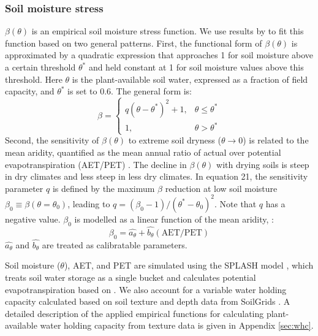 \documentclass[gmd, manuscript]{copernicus}
\begin{document}
\subsubsection{Soil moisture stress}
\label{sec:soilmstress}
$\beta(\theta)$ is an empirical soil moisture stress function. We use results by \citet{stocker18newphyt} to fit this function based on two general patterns. First, the functional form of $\beta(\theta)$ is approximated by a quadratic expression that approaches 1 for soil moisture above a certain threshold $\theta^{\ast}$ and held constant at 1 for soil moisture values above this threshold. Here $\theta$ is the plant-available soil water, expressed as a fraction of field capacity, and $\theta^{\ast}$ is set to 0.6. The general form is:
\begin{equation}
\label{eq:soilmstress}
    \beta =
\begin{cases}
    q(\theta - \theta^{\ast})^2 + 1,& \theta \leq \theta^{\ast}\\
    1,              & \theta > \theta^{\ast}
\end{cases}
\end{equation}
Second, the sensitivity of $\beta(\theta)$ to extreme soil dryness ($\theta \rightarrow 0$) is related to the mean aridity, quantified as the mean annual ratio of actual over potential evapotranspiration (AET/PET) \citep{stocker18newphyt}. The decline in $\beta(\theta)$ with drying soils is steep in dry climates and less steep in less dry climates. In equation 21, the sensitivity parameter $q$ is defined by the maximum $\beta$ reduction at low soil moisture $\beta_0\equiv\beta(\theta=\theta_0)$, leading to $q=(\beta_0-1)/(\theta^{\ast}-\theta_0)^2$. Note that $q$ has a negative value. $\beta_0$ is modelled as a linear function of the mean aridity, :
\begin{equation}
\label{eq:soilmsensitivity}
\beta_0 = \widehat{a_{\theta}} + \widehat{b_{\theta}} (\text{AET}/\text{PET})
\end{equation}
$\widehat{a_{\theta}}$ and $\widehat{b_{\theta}}$ are treated as calibratable parameters. 

Soil moisture ($\theta$), AET, and PET are simulated using the SPLASH model \citep{davis17}, which treats soil water storage as a single bucket and calculates potential evapotranspiration based on \citet{priestleytaylor72}. We also account for a variable water holding capacity calculated based on soil texture and depth data from SoilGrids \citep{Hengl2014-jm}. A detailed description of the applied empirical functions for calculating plant-available water holding capacity from texture data is given in Appendix \ref{sec:whc}.
\end{document}
